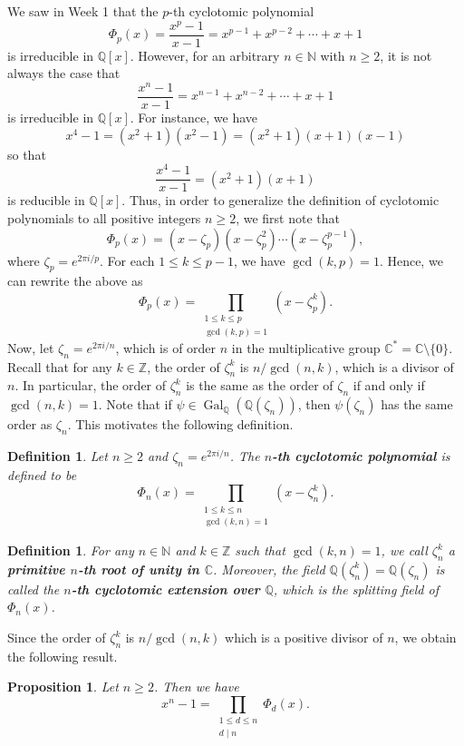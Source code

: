 \documentclass[10pt]{article}
\newcommand{\C}{\mathbb{C}}
\newcommand{\N}{\mathbb{N}}
\newcommand{\Z}{\mathbb{Z}}
\newcommand{\Q}{\mathbb{Q}}
\DeclareMathOperator{\Gal}{Gal}
\theoremstyle{newstyle}
\newtheorem{prop}[thm]{Proposition}
\newtheorem{defn}[thm]{Definition}
\begin{document}
We saw in Week 1 that the $p$-th cyclotomic polynomial 
\[ \Phi_p(x) = \frac{x^p-1}{x-1} = x^{p-1} + x^{p-2} + \cdots + x + 1 \] 
is irreducible in $\Q[x]$. However, for an arbitrary $n \in \N$ with $n \geq 2$, it is not 
always the case that 
\[ \frac{x^n-1}{x-1} = x^{n-1} + x^{n-2} + \cdots + x + 1 \] 
is irreducible in $\Q[x]$. For instance, we have 
\[ x^4 - 1 = (x^2 + 1)(x^2 - 1) = (x^2 + 1)(x+1)(x-1) \]
so that 
\[ \frac{x^4-1}{x-1} = (x^2+1)(x+1) \]
is reducible in $\Q[x]$. Thus, in order to generalize the definition of cyclotomic polynomials 
to all positive integers $n \geq 2$, we first note that 
\[ \Phi_p(x) = (x-\zeta_p)(x-\zeta_p^2) \cdots (x-\zeta_p^{p-1}), \]
where $\zeta_p = e^{2\pi i/p}$. For each $1 \leq k \leq p-1$, we have $\gcd(k, p) = 1$. 
Hence, we can rewrite the above as 
\[ \Phi_p(x) = \prod_{\substack{1\leq k \leq p \\ \gcd(k,p)=1}} (x - \zeta_p^k). \]
Now, let $\zeta_n = e^{2\pi i/n}$, which is of order $n$ in the multiplicative group 
$\C^* = \C \setminus \{0\}$. Recall that for any $k \in \Z$, the order of $\zeta_n^k$ is 
$n/\gcd(n, k)$, which is a divisor of $n$. In particular, the order of $\zeta_n^k$ is 
the same as the order of $\zeta_n$ if and only if $\gcd(n, k) = 1$. Note that 
if $\psi \in \Gal_{\Q}(\Q(\zeta_n))$, then $\psi(\zeta_n)$ has the same order as $\zeta_n$. 
This motivates the following definition. 

\begin{defn}
Let $n \geq 2$ and $\zeta_n = e^{2\pi i/n}$. The {\bf $n$-th cyclotomic polynomial} is defined to be 
\[ \Phi_n(x) = \prod_{\substack{1\leq k \leq n \\ \gcd(k, n) = 1}} (x - \zeta_n^k). \]
\end{defn}

\begin{defn}
For any $n \in \N$ and $k \in \Z$ such that $\gcd(k, n) = 1$, we call $\zeta_n^k$ a 
{\bf primitive $n$-th root of unity in $\C$}. Moreover, the field $\Q(\zeta_n^k) = \Q(\zeta_n)$ 
is called the {\bf $n$-th cyclotomic extension over $\Q$}, which is the splitting field of 
$\Phi_n(x)$. 
\end{defn}

Since the order of $\zeta_n^k$ is $n/\gcd(n, k)$ which is a positive divisor of $n$, 
we obtain the following result. 

\begin{prop}
Let $n \geq 2$. Then we have 
\[ x^n - 1 = \prod_{\substack{1 \leq d \leq n \\ d \mid n}} \Phi_d(x). \]
\end{prop}
\end{document}
